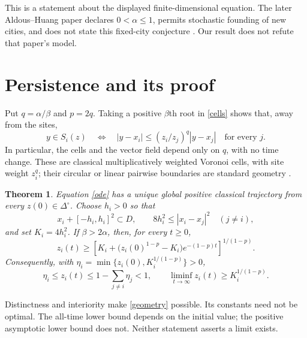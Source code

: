 \documentclass[11pt]{article}
\newtheorem{theorem}{Theorem}
\begin{document}
This is a statement about the displayed finite-dimensional equation. The later Aldous--Huang paper declares $0<\alpha\leq1$, permits stochastic founding of new cities, and does not state this fixed-city conjecture \cite[\S2]{AH12}. Our result does not refute that paper's model.

\section{Persistence and its proof}

Put $q=\alpha/\beta$ and $p=2q$. Taking a positive $\beta$th root in \eqref{cells} shows that, away from the sites,
\begin{equation}
 y\in S_i(z)\quad\Longleftrightarrow\quad
 |y-x_i|\leq (z_i/z_j)^q |y-x_j|\quad\text{for every }j.\label{dominance}
\end{equation}
In particular, the cells and the vector field depend only on $q$, with no time change.
These are classical multiplicatively weighted Voronoi cells, with site weight $z_i^q$; their circular or linear pairwise boundaries are standard geometry \cite[pp.~251--252]{AE84}.

\begin{theorem}\label{main}
Equation \eqref{ode} has a unique global positive classical trajectory from every $z(0)\in\Delta^\circ$. Choose $h_i>0$ so that
\begin{equation}
 x_i+[-h_i,h_i]^2\subset D,\qquad
 8h_i^2\leq |x_i-x_j|^2\quad(j\ne i),\label{geometry}
\end{equation}
and set $K_i=4h_i^2$. If $\beta>2\alpha$, then, for every $t\geq0$,
\begin{equation}
 z_i(t)\geq
 \left[K_i+\bigl(z_i(0)^{1-p}-K_i\bigr)e^{-(1-p)t}\right]^{1/(1-p)}.\label{quant}
\end{equation}
Consequently, with $\eta_i=\min\{z_i(0),K_i^{1/(1-p)}\}>0$,
\begin{equation}
 \eta_i\leq z_i(t)\leq1-\sum_{j\ne i}\eta_j<1,
 \qquad \liminf_{t\to\infty}z_i(t)\geq K_i^{1/(1-p)}.\label{uniform}
\end{equation}
\end{theorem}

Distinctness and interiority make \eqref{geometry} possible. Its constants need not be optimal. The all-time lower bound depends on the initial value; the positive asymptotic lower bound does not. Neither statement asserts a limit exists.
\end{document}

